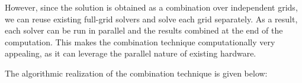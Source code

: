 However, since the solution is obtained as a combination
over independent grids, we can reuse existing full-grid solvers
and solve each grid separately. As a result, each
solver can be run in parallel and the results combined at the end of the computation.
This makes the combination technique computationally very appealing, as it can
leverage the parallel nature of existing hardware.
\cite{discoadapt}

The algorithmic realization of the combination technique is given below:

%
%
%
%
%
%
%
%
%
%
%
%
%
%
%
%
%
%
%
%
%
%
%
%
%
%
%
%
%
%
%
%

